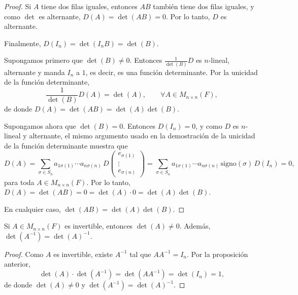 \documentclass[12pt,a4paper]{book}
\begin{document}
\begin{proof}
        Si $A$ tiene dos filas iguales, entonces $AB$ también tiene dos filas iguales, y como $\det$ es alternante, $D(A) = \det(AB) = 0$. Por lo tanto, $D$ es alternante.

        Finalmente, $D(I_n) = \det(I_n B) = \det(B)$.

        Supongamos primero que $\det(B) \neq 0$. Entonces $\tfrac{1}{\det(B)} D$ es $n$-lineal, alternante y manda $I_n$ a $1$, es decir, es una función determinante. Por la unicidad de la función determinante,
        \begin{equation*}
            \frac{1}{\det(B)} D(A) = \det(A), \qquad \forall A \in M_{n \times n}(F),
        \end{equation*}
        de donde $D(A) = \det(AB) = \det(A)\det(B)$.

        Supongamos ahora que $\det(B) = 0$. Entonces $D(I_n) = 0$, y como $D$ es $n$-lineal y alternante, el mismo argumento usado en la demostración de la unicidad de la función determinante muestra que
        \begin{equation*}
            D(A) = \sum_{\sigma \in S_n} a_{1\sigma(1)} \cdots a_{n\sigma(n)} \, D
            \begin{pmatrix}
                e_{\sigma(1)} \\
                \vdots \\
                e_{\sigma(n)}
            \end{pmatrix}
            = \sum_{\sigma \in S_n} a_{1\sigma(1)} \cdots a_{n\sigma(n)} \, \text{signo}(\sigma) \, D(I_n) = 0,
        \end{equation*}
        para toda $A \in M_{n \times n}(F)$. Por lo tanto, $D(A) = \det(AB) = 0 = \det(A) \cdot 0 = \det(A)\det(B)$.

        En cualquier caso, $\det(AB) = \det(A)\det(B)$.
    \end{proof}

    \begin{corolario}
        Si $A \in M_{n \times n}(F)$ es invertible, entonces $\det(A) \neq 0$. Además, $\det(A^{-1}) = \det(A)^{-1}$.
    \end{corolario}

    \begin{proof}
        Como $A$ es invertible, existe $A^{-1}$ tal que $AA^{-1} = I_n$. Por la proposición anterior,
        \begin{equation*}
            \det(A) \cdot \det(A^{-1}) = \det(AA^{-1}) = \det(I_n) = 1,
        \end{equation*}
        de donde $\det(A) \neq 0$ y $\det(A^{-1}) = \det(A)^{-1}$.
    \end{proof}
\end{document}
